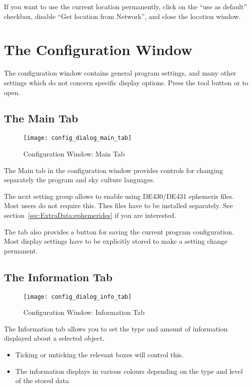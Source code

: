 \noindent If you want to use the current location permanently, click on the
``use as default'' checkbox, disable ``Get location from Network'',
and close the location window.



\section{The Configuration Window}
\label{sec:gui:configuration}

The configuration window contains general program settings, and many
other settings which do not concern specific display options. Press
the tool button  or  to open.


\subsection{The Main Tab}
\label{sec:gui:configuration:main}


\begin{figure}[bp]
\centering\texttt{[image: config\_dialog\_main\_tab]}
\caption{Configuration Window: Main Tab}
\label{fig:gui:configuration:main}
\end{figure}

The Main tab in the configuration window provides controls for
changing separately the program and sky culture languages.

The next setting group allows to enable using DE430/DE431 ephemeris
files. Most users do not require this. Thes files have to be installed
separately. See section~\ref{sec:ExtraData:ephemerides} if you are
interested.

The tab also provides a button for saving the current program
configuration. Most display settings have to be explicitly stored to
make a setting change permanent.

\subsection{The Information Tab}
\label{sec:gui:configuration:info}


\begin{figure}[p]
\centering\texttt{[image: config\_dialog\_info\_tab]}
\caption{Configuration Window: Information Tab}
\label{fig:gui:configuration:info}
\end{figure}

The Information tab allows you to set the type and amount of information
displayed about a selected object.
\begin{itemize}
\item Ticking or unticking the relevant boxes will control this.
\item The information displays in various colours depending on the type and
level of the stored data
\end{itemize}

